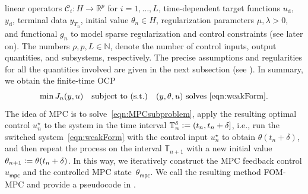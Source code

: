 \documentclass[reqno]{amsart}
\newcommand{\R}{\mathbb R}
\newcommand{\N}{\mathbb N}
\newcommand{\timeInt}{\mathbb{T}}
\newcommand{\state}{\theta}
\newcommand{\desired}[1]{#1_{\mathrm{d}}}
\newcommand{\inpVar}{u}
\newcommand{\inpVarDes}{\desired{u}}
\newcommand{\inpVarDim}{\rho}
\newcommand{\outVar}{y}
\newcommand{\outVarDes}{\desired{y}}
\newcommand{\outVarDim}{p}
\newcommand{\cOper}{\calC}
\newcommand{\stateMPC}{\state_{\mathsf{mpc}}}
\newcommand{\inpVarMPC}{\inpVar_{\mathsf{mpc}}}
\newcommand{\nrModes}{L}
\newcommand{\calC}{\mathcal{C}}
\newcommand{\abbr}[1]{\textsf{#1}\xspace}
\newcommand{\FOM}{\abbr{FOM}}
\newcommand{\MPC}{\abbr{MPC}}
\newcommand{\OCP}{\abbr{OCP}}
\begin{document}
%
linear operators $\cOper_i\colon H\to \R^{\outVarDim}$ for $i=1,\ldots,\nrModes$,
time-dependent target functions $\inpVarDes$, $\outVarDes$, terminal data $y_{T_n}$, initial value $\state_n\in H$, regularization parameters $\mu,\lambda>0$, and functional $g_n$ to model sparse regularization and control constraints (see  later on). The numbers $\inpVarDim,\outVarDim,\nrModes\in\N$, denote the number of control inputs, output quantities, and subsystems, respectively. The precise assumptions and regularities for all the quantities involved are given in the next subsection (see ).
In summary, we obtain the finite-time \OCP
%
\begin{equation}
	\label{eqn:MPCsubproblem}
    \min J_n(\outVar,\inpVar)\quad\text{subject to (s.t.)}\quad(\outVar,\state,\inpVar) \mbox{ solves } \eqref{eqn:weakForm}.
\end{equation}
%
The idea of \MPC is to solve~\eqref{eqn:MPCsubproblem}, apply the resulting optimal control $\inpVar_n^\star$ to the system in the time interval $\timeInt_n^\delta \vcentcolon= (t_n,t_n+\delta]$, i.e., run the switched system~\eqref{eqn:weakForm} with the control input $\inpVar_n^\star$ to obtain $\state(t_n+\delta)$, and then repeat the process on the interval $\timeInt_{n+1}$ with a new initial value $\state_{n+1} \vcentcolon= \state(t_n+\delta)$. In this way, we iteratively construct the \MPC feedback control $\inpVarMPC$ and the controlled \MPC state~$\stateMPC$. We call the resulting method \FOM-\MPC and provide a pseudocode in .
\end{document}
